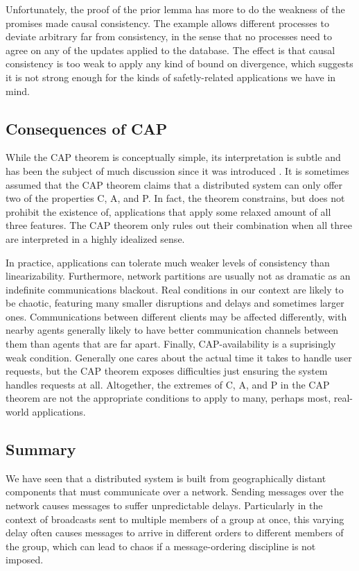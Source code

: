 \documentclass[]             %
{NASA}                       %
\theoremstyle{definition}
\begin{document}
Unfortunately, the proof of the prior lemma has more to do the
weakness of the promises made causal consistency. The example allows
different processes to deviate arbitrary far from consistency, in the
sense that no processes need to agree on any of the updates applied to
the database. The effect is that causal consistency is too weak to
apply any kind of bound on divergence, which suggests it is not strong
enough for the kinds of safetly-related applications we have in mind.

\subsection{Consequences of CAP}
\label{interpretation-of-the-cap-theorem}
While the CAP theorem is conceptually simple, its interpretation is
subtle and has been the subject of much discussion since it was
introduced \cite{2012CAP12Years}. It is sometimes assumed that the CAP
theorem claims that a distributed system can only offer two of the
properties C, A, and P.  In fact, the theorem constrains, but does not
prohibit the existence of, applications that apply some relaxed amount
of all three features. The CAP theorem only rules out their
combination when all three are interpreted in a highly idealized
sense.

In practice, applications can tolerate much weaker levels of
consistency than linearizability. Furthermore, network partitions are
usually not as dramatic as an indefinite communications blackout. Real
conditions in our context are likely to be chaotic, featuring many
smaller disruptions and delays and sometimes larger
ones. Communications between different clients may be affected
differently, with nearby agents generally likely to have better
communication channels between them than agents that are far
apart. Finally, CAP-availability is a suprisingly weak condition.
Generally one cares about the actual time it takes to handle user
requests, but the CAP theorem exposes difficulties just ensuring the
system handles requests at all. Altogether, the extremes of C, A, and
P in the CAP theorem are not the appropriate conditions to apply to
many, perhaps most, real-world applications.

\subsection{Summary}
\label{sec:background-summary}

We have seen that a distributed system is built from geographically
distant components that must communicate over a network. Sending
messages over the network causes messages to suffer unpredictable
delays. Particularly in the context of broadcasts sent to multiple
members of a group at once, this varying delay often causes messages
to arrive in different orders to different members of the group, which
can lead to chaos if a message-ordering discipline is not imposed.
\end{document}
